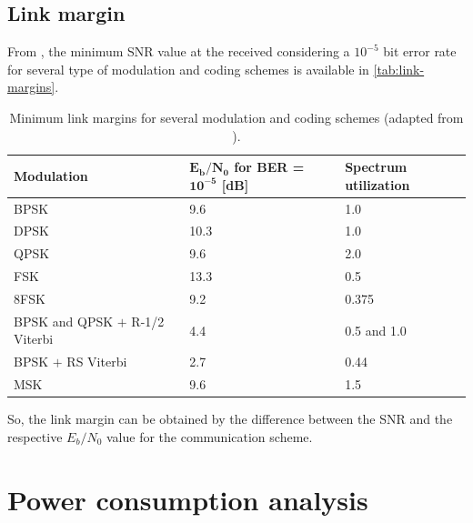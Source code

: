 \subsection{Link margin}

From \cite{larson2005}, the minimum SNR value at the received considering a $10^{-5}$ bit error rate for several type of modulation and coding schemes is available in \autoref{tab:link-margins}.

\begin{table}[!ht]
    \centering
    \begin{tabular}{lC{0.2\textwidth}C{0.2\textwidth}}
        \toprule[1.5pt]
        \textbf{Modulation} & \textbf{$\mathbf{E_{b}/N_{0}}$ for BER = $\mathbf{10^{-5}}$ [dB]} & \textbf{Spectrum utilization} \\
        \midrule
        BPSK                            & 9.6  & 1.0 \\
        DPSK                            & 10.3 & 1.0 \\
        QPSK                            & 9.6  & 2.0 \\
        FSK                             & 13.3 & 0.5 \\
        8FSK                            & 9.2  & 0.375 \\
        BPSK and QPSK $+$ R-1/2 Viterbi & 4.4  & 0.5 and 1.0 \\
        BPSK $+$ RS Viterbi             & 2.7  & 0.44 \\
        MSK                             & 9.6  & 1.5 \\
        \bottomrule[1.5pt]
    \end{tabular}
    \caption{Minimum link margins for several modulation and coding schemes (adapted from \cite{larson2005}).}
    \label{tab:link-margins}
\end{table}

So, the link margin can be obtained by the difference between the SNR and the respective $E_{b}/N_{0}$ value for the communication scheme.


\section{Power consumption analysis}

